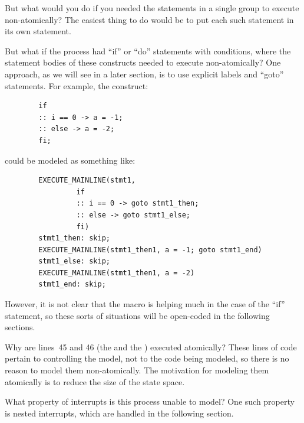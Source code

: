 \begin{enumerate}
\QuickQ{}
	But what would you do if you needed the statements in a single
	 group to execute non-atomically?
\QuickA{}
	The easiest thing to do would be to put
	each such statement in its own 
	statement.

\QuickQ{}
	But what if the  process had
	``if'' or ``do'' statements with conditions,
	where the statement bodies of these constructs
	needed to execute non-atomically?
\QuickA{}
	One approach, as we will see in a later section,
	is to use explicit labels and ``goto'' statements.
	For example, the construct:

	\vspace{5pt}
	\begin{minipage}[t]{\columnwidth}
	\scriptsize
	\begin{verbatim}
		if
		:: i == 0 -> a = -1;
		:: else -> a = -2;
		fi;
	\end{verbatim}
	\end{minipage}
	\vspace{5pt}

	could be modeled as something like:

	\vspace{5pt}
	\begin{minipage}[t]{\columnwidth}
	\scriptsize
	\begin{verbatim}
		EXECUTE_MAINLINE(stmt1,
				 if
				 :: i == 0 -> goto stmt1_then;
				 :: else -> goto stmt1_else;
				 fi)
		stmt1_then: skip;
		EXECUTE_MAINLINE(stmt1_then1, a = -1; goto stmt1_end)
		stmt1_else: skip;
		EXECUTE_MAINLINE(stmt1_then1, a = -2)
		stmt1_end: skip;
	\end{verbatim}
	\end{minipage}
	\vspace{5pt}

	However, it is not clear that the macro is helping much in the case
	of the ``if'' statement, so these sorts of situations will
	be open-coded in the following sections.

\QuickQ{}
	Why are lines~45 and 46 (the 
	and the ) executed atomically?
\QuickA{}
	These lines of code pertain to controlling the
	model, not to the code being modeled, so there is no reason to
	model them non-atomically.
	The motivation for modeling them atomically is to reduce the size
	of the state space.

\QuickQ{}
	What property of interrupts is this 
	process unable to model?
\QuickA{}
	One such property is nested interrupts,
	which are handled in the following section.


\end{enumerate}
